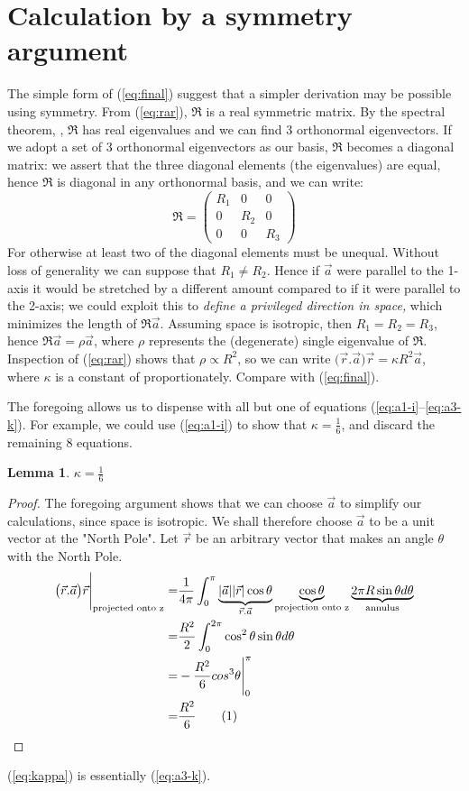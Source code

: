 \documentclass[]{article}
\newcommand\numberthis{\addtocounter{equation}{1}\tag{\theequation}}
\newtheorem{lemma}{Lemma}
\begin{document}
\section{Calculation by a symmetry argument}\label{sect:symmetry}
The simple form of (\ref{eq:final}) suggest that a simpler derivation may be possible using symmetry. From (\ref{eq:rar}), $\mathfrak{R}$ is a real symmetric matrix. By the spectral theorem, \cite{spectral-theorem} \cite{bellman1970}, $\mathfrak{R}$ has real eigenvalues and we can find 3 orthonormal eigenvectors. If we adopt a set of 3 orthonormal eigenvectors as our basis, $\mathfrak{R}$ becomes a diagonal matrix: we assert that the three diagonal elements (the eigenvalues) are equal, hence $\mathfrak{R}$ is diagonal in any orthonormal basis, and we can write:
\[\mathfrak{R}= 
\begin{pmatrix}
R_1 & 0 & 0 \\
0 & R_2 & 0 \\
0 & 0 & R_3
\end{pmatrix}
\]
For otherwise at least two of the diagonal elements must be unequal. Without loss of generality we can suppose that $R_1 \neq R_2$. Hence if $\vec{a}$ were parallel to the 1-axis it would be stretched by a different amount compared to if it were parallel to the 2-axis; we could exploit this to \emph{define a privileged direction in space,} which minimizes the length of $\mathfrak{R}\vec{a}$. Assuming space is isotropic, then $R_1=R_2=R_3$, hence $\mathfrak{R}\vec{a}=\rho\vec{a}$, where $\rho$ represents the (degenerate) single eigenvalue of $\mathfrak{R}$. Inspection of (\ref{eq:rar}) shows that $\rho \propto R^2$, so we can write $\big(\vec{r}.\vec{a}\big)\vec{r}=\kappa R^2 \vec{a}$, where $\kappa$ is a constant of proportionately. Compare with (\ref{eq:final}).

The foregoing allows us to dispense with all but one of equations (\ref{eq:a1-i}--\ref{eq:a3-k}). For example, we could use (\ref{eq:a1-i}) to show that $\kappa=\frac{1}{6}$, and discard the remaining 8 equations.

\begin{lemma}
	$\kappa=\frac{1}{6}$
\end{lemma}
\begin{proof}
	The foregoing argument shows that we can choose $\vec{a}$ to simplify our calculations, since space is isotropic. We shall therefore choose $\vec{a}$ to be a unit vector at the "North Pole". Let $\vec{r}$ be an arbitrary vector that makes an angle $\theta$ with the North Pole.
	\begin{align*}
	\big(\vec{r}.\vec{a}\big)\vec{r}\Bigg|_\text{projected onto z}=&\frac{1}{4\pi}\int_{0}^{\pi}\underbrace{|\vec{a}||\vec{r}|\cos\theta}_{\vec{r}.\vec{a}}\underbrace{\cos \theta}_{\text{projection onto z}}\underbrace{2\pi R\sin\theta d\theta}_\text{annulus}\\
	=& \frac{R^2}{2}\int_{0}^{2\pi}\cos^2 \theta \sin \theta d \theta\\
	=& - \frac{R^2}{6} cos^3\theta\Bigg |_0^{\pi}\\
	=& \frac{R^2}{6} \numberthis \label{eq:kappa}
	\end{align*}
\end{proof}
(\ref{eq:kappa}) is essentially (\ref{eq:a3-k}).
\end{document}
